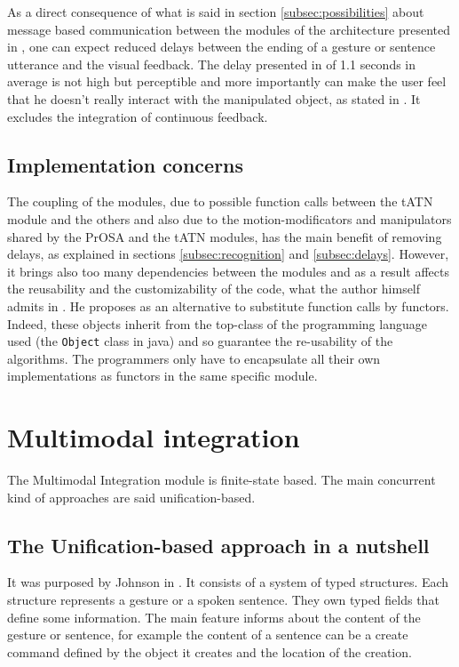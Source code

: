 \documentclass[a4paper]{article}
\begin{document}
As a direct consequence of what is said in section \ref{subsec:possibilities} about message based communication between the modules of the architecture presented in \cite{kaiser}, one can expect reduced delays between the ending of a gesture or sentence utterance and the visual feedback. The delay presented in \cite{kaiser} of 1.1 seconds in average is not high but perceptible and more importantly can make the user feel that he doesn't really interact with the manipulated object, as stated in \cite{responsetime}. It excludes the integration of continuous feedback.

\subsection{Implementation concerns}
The coupling of the modules, due to possible function calls between the tATN module and the others and also due to the motion-modificators and manipulators shared by the PrOSA and the tATN modules, has the main benefit of removing delays, as explained in sections \ref{subsec:recognition} and \ref{subsec:delays}. However, it brings also too many dependencies between the modules and as a result affects the reusability and the customizability of the code, what the author himself admits in \cite{hcii}. He proposes as an alternative to substitute function calls by functors. Indeed, these objects inherit from the top-class of the programming language used (the \texttt{Object} class in java) and so guarantee the re-usability of the algorithms. The programmers only have to encapsulate all their own implementations as functors in the same specific module. 

\section{Multimodal integration}

The Multimodal Integration module is finite-state based. The main concurrent kind of approaches are said unification-based.

\subsection{The Unification-based approach in a nutshell}
It was purposed by Johnson in \cite{unification-based}. It consists of a system of typed structures. Each structure represents a gesture or a spoken sentence. They own typed fields that define some information. The main feature informs about the content of the gesture or sentence, for example the content of a sentence can be a create command defined by the object it creates and the location of the creation.
\end{document}
